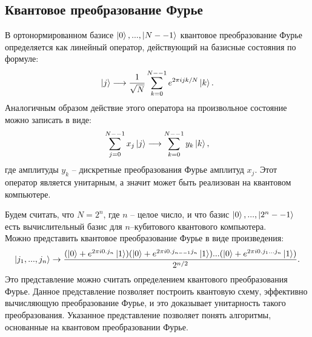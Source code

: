 \documentclass[12pt,a4paper]{article}
\begin{document}
	\subsection{Квантовое преобразование Фурье}
	В ортонормированном базисе $\ket{0},...,\ket{N--1}$ квантовое преобразование Фурье определяется как линейный оператор, действующий на базисные состояния по формуле\cite{1}: \\
	\begin{equation}\label{eq_4}
		\ket{j}\longrightarrow\frac{1}{\sqrt{N}}\sum_{k=0}^{N--1}e^{2\pi ijk/N}\ket{k}.
	\end{equation}
	Аналогичным образом действие этого оператора на произвольное состояние можно записать в виде:\\
	\begin{equation}\label{eq_5}
		\sum_{j=0}^{N--1}x_{j}\ket{j}\longrightarrow\sum_{k=0}^{N--1}y_{k}\ket{k},
	\end{equation}
	где амплитуды $y_{k}$ -- дискретные преобразования Фурье амплитуд $x_{j}$. Этот оператор является унитарным, а значит может быть реализован на квантовом компьютере.\par
	Будем считать, что $N=2^{n}$, где $n$ -- целое число, и что базис $\ket{0},...,\ket{2^{n}--1}$ есть вычислительный базис для $n$--кубитового квантового компьютера.\\
	Можно представить квантовое преобразование Фурье в виде произведения:\\
	\begin{equation}\label{eq_6}
		\ket{j_{1},...,j_{n}}\rightarrow\frac{(\ket{0}+e^{2\pi i0.j_{n}}\ket{1})(\ket{0}+e^{2\pi i0.j_{n--1}j_{n}}\ket{1})...(\ket{0}+e^{2\pi i0.j_{1}...j_{n}}\ket{1})}{2^{n/2}}.
	\end{equation}
	Это представление можно считать определением квантового преобразования Фурье. Данное представление
	позволяет построить квантовую схему, эффективно вычисляющую преобразование Фурье, и это доказывает унитарность такого преобразования. Указанное представление позволяет понять алгоритмы, основанные на квантовом преобразовании Фурье. \\
	
\end{document}
